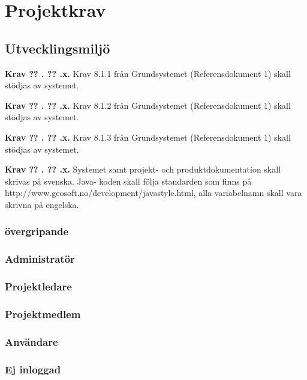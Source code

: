 \documentclass[a4paper]{article}
\newcommand\getcurrentref[1]{%
 \ifnumequal{\value{#1}}{0}
  {??}
  {\the\value{#1}}%
}
\newcommand\requirement[2]{
	\numberedrow{Krav}{#1}{#2}
}
\newcommand\numberedrow[3]{
	\noindent
	\textbf{#1 \getcurrentref{section}.\getcurrentref{subsection}.#2.} #3
	
}
\begin{document}
\section{Projektkrav}
	\subsection{Utvecklingsmiljö}
	\requirement{x}{Krav 8.1.1 från Grundsystemet (Referensdokument 1) skall stödjas av systemet.}
	\requirement{x}{Krav 8.1.2 från Grundsystemet (Referensdokument 1) skall stödjas av systemet.}
	\requirement{x}{Krav 8.1.3 från Grundsystemet (Referensdokument 1) skall stödjas av systemet.}
	\requirement{x}{Systemet samt projekt- och produktdokumentation skall skrivas på svenska. Java- koden skall följa standarden som finns på http://www.geosoft.no/development/javastyle.html, alla variabelnamn skall vara skrivna på engelska.}

		\subsubsection*{övergripande}
		\subsubsection*{Administratör}
		\subsubsection*{Projektledare}
		\subsubsection*{Projektmedlem}
		\subsubsection*{Användare}
		\subsubsection*{Ej inloggad}	
\end{document}
